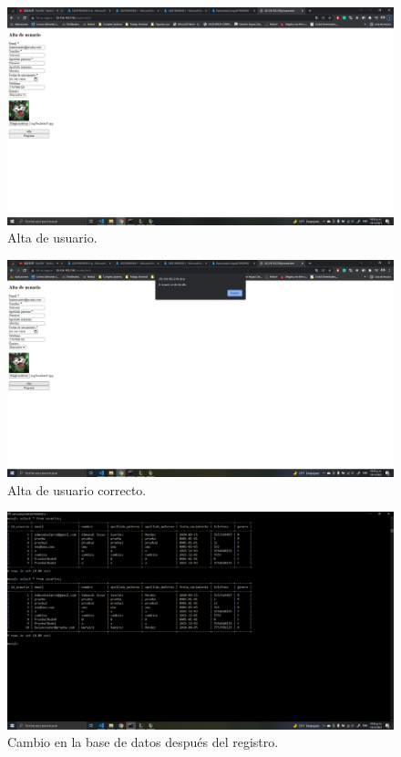 \documentclass[11pt]{article}
\begin{document}
		\begin{figure}[H]
			\centering
			\includegraphics[scale=0.34]{resources/prueba2.1.png}
			\caption{Alta de usuario.}\label{fig:picture}
		\end{figure}
		\begin{figure}[H]
			\centering
			\includegraphics[scale=0.34]{resources/prueba2.2.png}
			\caption{Alta de usuario correcto.}\label{fig:picture}
		\end{figure}
		\begin{figure}[H]
			\centering
			\includegraphics[scale=0.34]{resources/prueba2.3.png}
			\caption{Cambio en la base de datos después del registro.}\label{fig:picture}
		\end{figure}
\end{document}
